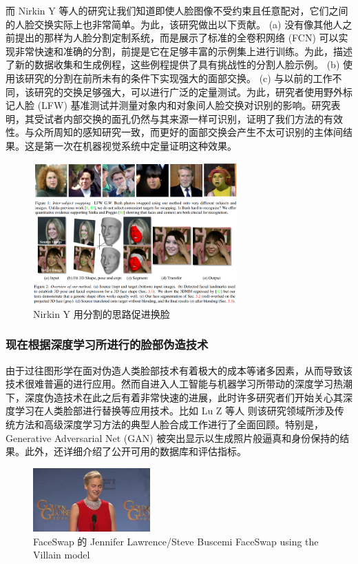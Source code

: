 而 Nirkin Y 等人\cite{nirkin2018face}的研究让我们知道即使人脸图像不受约束且任意配对，它们之间的人脸交换实际上也非常简单。为此，该研究做出以下贡献。 (a) 没有像其他人之前提出的那样为人脸分割定制系统，而是展示了标准的全卷积网络 (FCN) 可以实现非常快速和准确的分割，前提是它在足够丰富的示例集上进行训练。为此，描述了新的数据收集和生成例程，这些例程提供了具有挑战性的分割人脸示例。 (b) 使用该研究的分割在前所未有的条件下实现强大的面部交换。 (c) 与以前的工作不同，该研究的交换足够强大，可以进行广泛的定量测试。为此，研究者使用野外标记人脸 (LFW) 基准测试并测量对象内和对象间人脸交换对识别的影响。研究表明，其受试者内部交换的面孔仍然与其来源一样可识别，证明了我们方法的有效性。与众所周知的感知研究一致，而更好的面部交换会产生不太可识别的主体间结果。这是第一次在机器视觉系统中定量证明这种效果。

\begin{figure}[htb]
\centering 
\includegraphics[width=0.70\textwidth]{img/ch1m6.png} 
\caption{Nirkin Y 用分割的思路促进换脸}
\label{Test}
\end{figure}

\subsubsection{现在根据深度学习所进行的脸部伪造技术}

由于过往图形学在面对伪造人类脸部技术有着极大的成本等诸多因素，从而导致该技术很难普遍的进行应用。然而自进入人工智能与机器学习所带动的深度学习热潮下，深度伪造技术在此之后有着非常快速的进展，此时许多研究者们开始关心其深度学习在人类脸部进行替换等应用技术。比如 Lu Z 等人 \cite{lu2017recent}则该研究领域所涉及传统方法和高级深度学习方法的典型人脸合成工作进行了全面回顾。特别是，Generative Adversarial Net (GAN) 被突出显示以生成照片般逼真和身份保持的结果。此外，还详细介绍了公开可用的数据库和评估指标。

\begin{figure}[htb]
\centering 
\includegraphics[width=0.40\textwidth]{img/ch1m7.png} 
\caption{FaceSwap 的 Jennifer Lawrence/Steve Buscemi FaceSwap using the Villain model}
\label{Test}
\end{figure}

